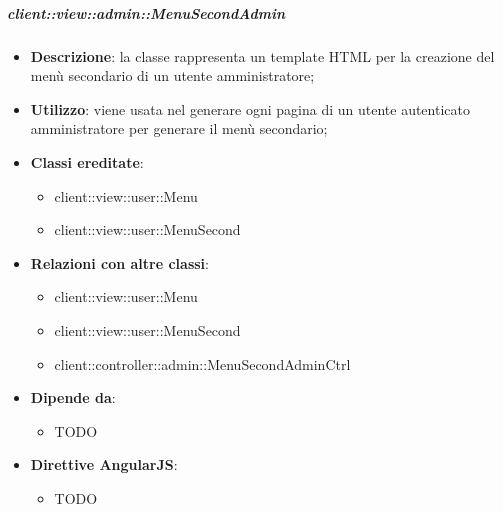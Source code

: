 		\subparagraph{client::view::admin::MenuSecondAdmin} %
		\label{subp:bdsm_app_client_view_admin_menusecondadmin}

			\begin{itemize}
				\item \textbf{Descrizione}: la classe rappresenta un template HTML per la creazione del menù secondario di un utente amministratore;
				\item \textbf{Utilizzo}: viene usata nel generare ogni pagina di un utente autenticato amministratore per generare il menù secondario;
				\item \textbf{Classi ereditate}:
					\begin{itemize}
						\item client::view::user::Menu
						\item client::view::user::MenuSecond
					\end{itemize}
				\item \textbf{Relazioni con altre classi}:
					\begin{itemize}
						\item client::view::user::Menu
						\item client::view::user::MenuSecond
						\item client::controller::admin::MenuSecondAdminCtrl
					\end{itemize}
				\item \textbf{Dipende da}:
					\begin{itemize}
						\item TODO
					\end{itemize}
				\item \textbf{Direttive AngularJS}:
					\begin{itemize}
						\item TODO
					\end{itemize}
			\end{itemize}

